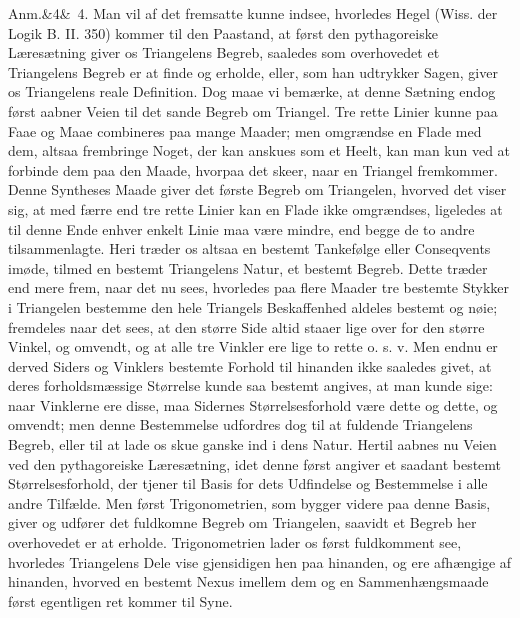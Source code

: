 \documentclass[12pt]{book}
\def\sperr#1{#1}%
\def\textit#1{#1}%
\def\emph#1{#1}%
\newcommand{\sperr}[1]{\textls[180]{#1}}
\newcommand{\anm}[1]{%
  \par\vspace{0.5\baselineskip}%
  \noindent\hspace{\parindent}\sperr{Anm.}\ifx&#1&\else~\textit{#1}.\fi
  \enspace\ignorespaces
}
\newcommand{\opage}[1]{\marginnote{\footnotesize\textit{[#1]}}}
\begin{document}
\anm{4} Man vil af det fremsatte kunne indsee, hvorledes Hegel (Wiss. der Logik
B. II. 350) kommer til den Paastand, at først den pythagoreiske Læresætning
giver os Triangelens Begreb, saaledes som overhovedet et Triangelens Begreb er
at finde og erholde, eller, som han udtrykker Sagen, giver os Triangelens reale
Definition. Dog maae vi bemærke, at denne Sætning endog først aabner Veien til
det sande Begreb om Triangel. Tre rette Linier kunne paa Faae og Maae
combineres paa mange Maader; men omgrændse en Flade med dem, altsaa frembringe
Noget, der kan anskues som et Heelt, kan man kun ved at forbinde dem paa den
Maade, hvorpaa det skeer, naar en Triangel fremkommer. Denne Syntheses
\emph{Maade} giver det første Begreb om Triangelen, hvorved det viser sig, at
med færre end tre rette Linier kan en Flade ikke omgrændses, ligeledes at til
denne Ende enhver enkelt Linie maa være mindre, end begge de to andre
tilsammenlagte. Heri træder os altsaa en bestemt Tankefølge eller Conseqvents
imøde, tilmed en bestemt Triangelens Natur, et bestemt Begreb. Dette træder end
mere frem, naar det nu sees, hvorledes paa flere Maader tre bestemte Stykker i
Triangelen bestemme den hele Triangels Beskaffenhed aldeles bestemt og nøie;
fremdeles naar det sees, at den større Side altid staaer lige over for den
større Vinkel, og
\opage{168} omvendt, og at alle tre Vinkler ere lige to rette o. s. v. Men endnu er derved
Siders og Vinklers bestemte Forhold til hinanden ikke saaledes givet, at deres
forholdsmæssige Størrelse kunde saa bestemt angives, at man kunde sige: naar
Vinklerne ere disse, maa Sidernes Størrelsesforhold være dette og dette, og
omvendt; men denne Bestemmelse udfordres dog til at fuldende Triangelens
Begreb, eller til at lade os skue ganske ind i dens Natur. Hertil aabnes nu
Veien ved den pythagoreiske Læresætning, idet denne først angiver et saadant
bestemt Størrelsesforhold, der tjener til Basis for dets Udfindelse og
Bestemmelse i alle andre Tilfælde. Men først Trigonometrien, som bygger videre
paa denne Basis, giver og udfører det fuldkomne Begreb om Triangelen, saavidt
et Begreb her overhovedet er at erholde. Trigonometrien lader os først
fuldkomment see, hvorledes Triangelens Dele vise gjensidigen hen paa hinanden,
og ere afhængige af hinanden, hvorved en bestemt Nexus imellem dem og en
Sammenhængsmaade først egentligen ret kommer til Syne.
\end{document}
